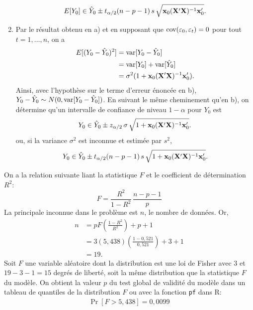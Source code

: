 \begin{solution}{3.5}
\begin{enumerate}
\begin{displaymath}
         E [ Y_0 ]
         \in \hat{Y}_0 \pm t_{\alpha/2}(n - p - 1)\, s\,
         \sqrt{\mathbf{x}_0 (\mathbf{X}^\prime \mathbf{X})^{-1} \mathbf{x}_0^\prime}.
       \end{displaymath}
     \item Par le résultat obtenu en a) et en supposant que
       $\mathrm{cov}(\varepsilon_0, \varepsilon_t) = 0$ pour tout $t = 1,
       \dots, n$, on a
       \begin{align*}
         E [ (Y_0 - \hat{Y}_0)^2 ]
         &= \mathrm{var} [ Y_0 - \hat{Y}_0 ] \\
         &= \mathrm{var} [ Y_0 ] + \mathrm{var} [ \hat{Y}_0 ] \\
         &= \sigma^2 (1 + \mathbf{x}_0 (\mathbf{X}^\prime \mathbf{X})^{-1}
         \mathbf{x}_0^\prime).
       \end{align*}
       Ainsi, avec l'hypothèse sur le terme d'erreur énoncée en b),
       $Y_0 - \hat{Y}_0 \sim N(0, \mathrm{var} [ Y_0 - \hat{Y}_0 ])$. En suivant
       le même cheminement qu'en b), on détermine qu'un intervalle de
       confiance de niveau $1 - \alpha$ pour $Y_0$ est
       \begin{displaymath}
         Y_0
         \in \hat{Y}_0 \pm z_{\alpha/2}\, \sigma\,
         \sqrt{1 + \mathbf{x}_0 (\mathbf{X}^\prime \mathbf{X})^{-1} \mathbf{x}_0^\prime}.
       \end{displaymath}
       ou, si la variance $\sigma^2$ est inconnue et estimée par
       $s^2$,
       \begin{displaymath}
         Y_0
         \in \hat{Y}_0 \pm t_{\alpha/2}(n - p - 1)\, s\,
         \sqrt{1 + \mathbf{x}_0 (\mathbf{X}^\prime \mathbf{X})^{-1} \mathbf{x}_0^\prime}.
       \end{displaymath}
     \end{enumerate}
   
\end{solution}
\begin{solution}{3.6}
    On a la relation suivante liant la statistique $F$ et le
    coefficient de détermination $R^2$:
    \begin{displaymath}
      F = \frac{R^2}{1 - R^2}\, \frac{n - p - 1}{p}
    \end{displaymath}
    La principale inconnue dans le problème est $n$, le nombre de
    données. Or,
    \begin{align*}
      n
      &= p F \left( \frac{1 - R^2}{R^2} \right) + p + 1 \\
      &= 3 (5,438) \left( \frac{1 - 0,521}{0,521} \right) + 3 + 1 \\
      &= 19.
    \end{align*}
    Soit $F$ une variable aléatoire dont la distribution est une loi
    de Fisher avec $3$ et $19 - 3 - 1 = 15$ degrés de liberté, soit la
    même distribution que la statistique $F$ du modèle. On obtient la
    valeur $p$ du test global de validité du modèle dans un tableau de
    quantiles de la distribution $F$ ou avec la fonction \texttt{pf}
    dans R:
    \begin{align*}
      \Pr[F > 5,438] = 0,0099
    \end{align*}
  
\end{solution}
